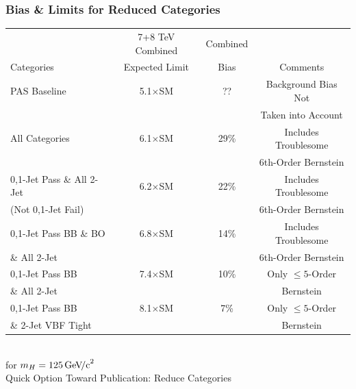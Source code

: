 \documentclass{beamer}
\newcommand{\GeVcc}{\ensuremath{\,\mathrm{Ge\kern -0.1em V\!/c}^2}}
\begin{document}
\begin{frame}
\frametitle{Bias \& Limits for Reduced Categories}
  \begin{center}
    \scriptsize
    \begin{tabular}{|l|c|c|c|} \hline
           & 7+8 TeV Combined & Combined &          \\
Categories & Expected Limit   & Bias     & Comments \\ \hline \hline
PAS Baseline & 5.1$\times$SM  & ??       & Background Bias Not         \\
                   &           &            & Taken into Account          \\ \hline
All Categories & 6.1$\times$SM  & 29\%       & Includes Troublesome         \\
                   &           &            & 6th-Order Bernstein         \\ \hline
0,1-Jet Pass \& All 2-Jet & 6.2$\times$SM  & 22\%       & Includes Troublesome         \\
(Not 0,1-Jet Fail) &           &            & 6th-Order Bernstein          \\ \hline
0,1-Jet Pass BB \& BO & 6.8$\times$SM  & 14\%       & Includes Troublesome         \\
\& All 2-Jet &           &            & 6th-Order Bernstein          \\ \hline
0,1-Jet Pass BB & 7.4$\times$SM  & 10\%       & Only $\leq5$-Order         \\
\& All 2-Jet &           &            &        Bernstein  \\ \hline
0,1-Jet Pass BB & 8.1$\times$SM  & 7\%       & Only $\leq5$-Order         \\
\& 2-Jet VBF Tight &           &            & Bernstein         \\ \hline
    \end{tabular}
    \\ for $m_H=125\GeVcc{}$
  \small
  \\ \vspace{1em}
  Quick Option Toward Publication: Reduce Categories
  \end{center}
\end{frame}
\end{document}
